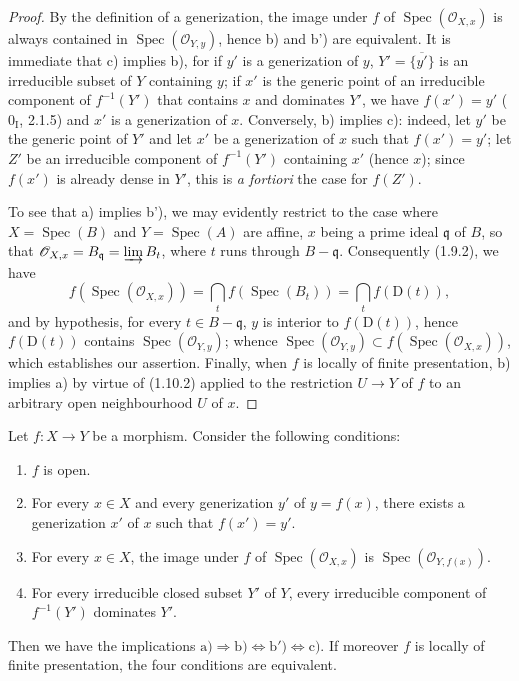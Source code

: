 \begin{proof}
By the definition of a generization, the image under $f$ of
$\operatorname{Spec}(\mathcal O_{X,x})$ is always contained in
$\operatorname{Spec}(\mathcal O_{Y,y})$, hence b) and b') are equivalent. It
is immediate
that c) implies b), for if $y'$ is a generization of $y$,
$Y'=\overline{\{y'\}}$ is an irreducible subset of $Y$ containing $y$; if
$x'$ is the generic point of an irreducible component of $f^{-1}(Y')$ that
contains $x$ and dominates $Y'$, we have $f(x')=y'$ ($0_{\mathrm I}$, 2.1.5)
and $x'$ is a generization of $x$. Conversely, b) implies c): indeed, let
$y'$ be the generic point of $Y'$ and let $x'$ be a generization of $x$ such
that $f(x')=y'$; let $Z'$ be an irreducible component of $f^{-1}(Y')$
containing $x'$ (hence $x$); since $f(x')$ is already dense in $Y'$, this is
\emph{a fortiori} the case for $f(Z')$.

To see that a) implies b'), we may evidently restrict to the case where
$X=\operatorname{Spec}(B)$ and $Y=\operatorname{Spec}(A)$ are affine, $x$
being a prime ideal
$\mathfrak q$ of $B$, so that
$\mathcal O_{X,x}=B_{\mathfrak q}=\varinjlim B_t$,
where $t$ runs through $B-\mathfrak q$. Consequently (1.9.2), we have
\[
  f(\operatorname{Spec}(\mathcal O_{X,x}))
  =\bigcap_t f(\operatorname{Spec}(B_t))=\bigcap_t f(\mathrm D(t)),
\]
and by hypothesis, for every $t\in B-\mathfrak q$, $y$ is interior to
$f(\mathrm D(t))$, hence $f(\mathrm D(t))$ contains
$\operatorname{Spec}(\mathcal O_{Y,y})$; whence
$\operatorname{Spec}(\mathcal O_{Y,y})
\subset f(\operatorname{Spec}(\mathcal O_{X,x}))$, which establishes
our assertion. Finally, when $f$ is locally of finite presentation, b)
implies a) by virtue of (1.10.2) applied to the restriction $U\to Y$ of $f$
to an arbitrary open neighbourhood $U$ of $x$.
\end{proof}

\begin{corollary}[1.10.4]
\label{IV.1.10.4}
Let $f:X\to Y$ be a morphism. Consider the following conditions:
\begin{enumerate}
  \item[a)] $f$ is open.
  \item[b)] For every $x\in X$ and every generization $y'$ of $y=f(x)$, there
  exists a generization $x'$ of $x$ such that $f(x')=y'$.
  \item[b')] For every $x\in X$, the image under $f$ of
  $\operatorname{Spec}(\mathcal O_{X,x})$ is
  $\operatorname{Spec}(\mathcal O_{Y,f(x)})$.
  \item[c)] For every irreducible closed subset $Y'$ of $Y$, every
  irreducible component of $f^{-1}(Y')$ dominates $Y'$.
\end{enumerate}
Then we have the implications
$\mathrm{a)}\Rightarrow\mathrm{b)}\Leftrightarrow\mathrm{b')}
\Leftrightarrow\mathrm{c)}$. If moreover $f$ is locally of finite
presentation, the four conditions are equivalent.
\end{corollary}


